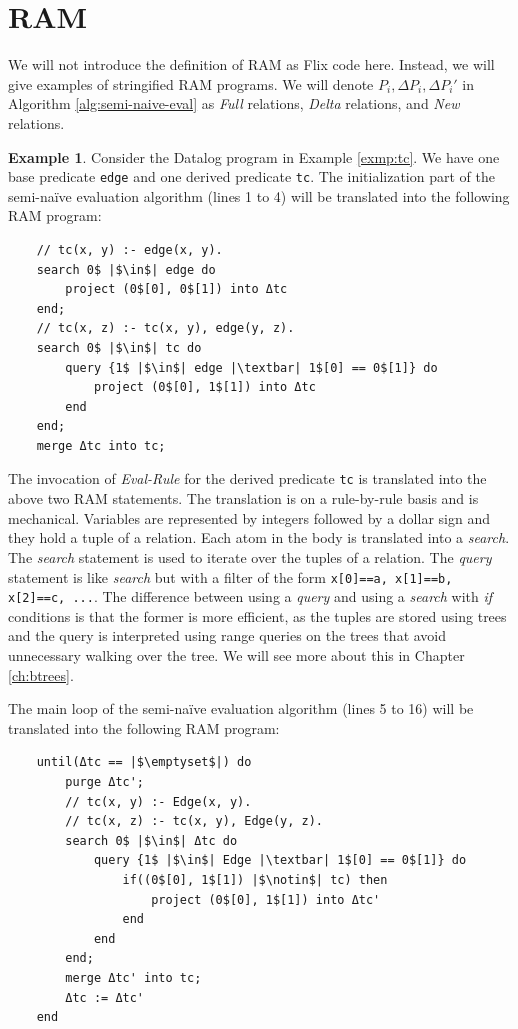 \documentclass[twoside,11pt]{report}
\theoremstyle{definition}
\newtheorem{exmp}{Example}[chapter]
\begin{document}
\section{RAM}

We will not introduce the definition of RAM as Flix code here. Instead, we will give examples of stringified RAM programs. We will denote $P_i, \Delta P_i, \Delta P_i'$ in Algorithm \ref{alg:semi-naive-eval} as \textit{Full} relations, \textit{Delta} relations, and \textit{New} relations.

\begin{exmp}
  Consider the Datalog program in Example \ref{exmp:tc}. We have one base predicate \texttt{edge} and one derived predicate \texttt{tc}. The initialization part of the semi-naïve evaluation algorithm (lines 1 to 4) will be translated into the following RAM program:
  \begin{verbatim}
    // tc(x, y) :- edge(x, y).
    search 0$ |$\in$| edge do
        project (0$[0], 0$[1]) into Δtc
    end;
    // tc(x, z) :- tc(x, y), edge(y, z).
    search 0$ |$\in$| tc do
        query {1$ |$\in$| edge |\textbar| 1$[0] == 0$[1]} do
            project (0$[0], 1$[1]) into Δtc
        end
    end;
    merge Δtc into tc;
  \end{verbatim}
  The invocation of \textit{Eval-Rule} for the derived predicate \texttt{tc} is translated into the above two RAM statements. The translation is on a rule-by-rule basis and is mechanical. Variables are represented by integers followed by a dollar sign and they hold a tuple of a relation. Each atom in the body is translated into a \textit{search}. The \textit{search} statement is used to iterate over the tuples of a relation. The \textit{query} statement is like \textit{search} but with a filter of the form \texttt{x[0]==a, x[1]==b, x[2]==c, ...}. The difference between using a \textit{query} and using a \textit{search} with \textit{if} conditions is that the former is more efficient, as the tuples are stored using trees and the query is interpreted using range queries on the trees that avoid unnecessary walking over the tree. We will see more about this in Chapter \ref{ch:btrees}.

  The main loop of the semi-naïve evaluation algorithm (lines 5 to 16) will be translated into the following RAM program:
  \begin{verbatim}
    until(Δtc == |$\emptyset$|) do
        purge Δtc';
        // tc(x, y) :- Edge(x, y).
        // tc(x, z) :- tc(x, y), Edge(y, z).
        search 0$ |$\in$| Δtc do
            query {1$ |$\in$| Edge |\textbar| 1$[0] == 0$[1]} do
                if((0$[0], 1$[1]) |$\notin$| tc) then
                    project (0$[0], 1$[1]) into Δtc'
                end
            end
        end;
        merge Δtc' into tc;
        Δtc := Δtc'
    end
  \end{verbatim}


\end{exmp}
\end{document}
